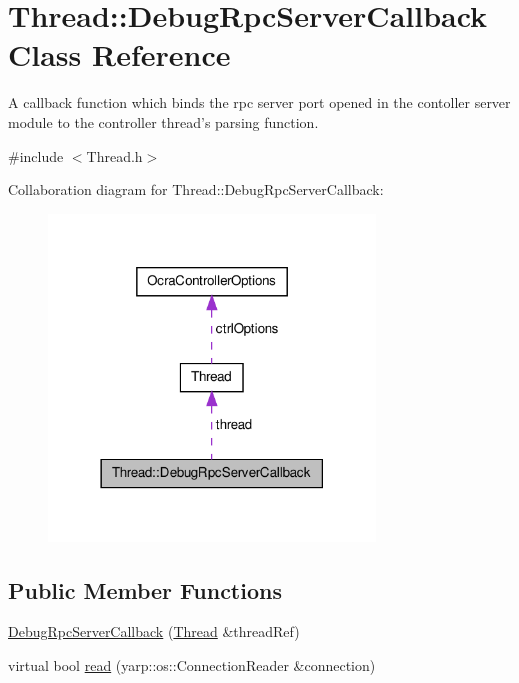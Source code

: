 \hypertarget{classThread_1_1DebugRpcServerCallback}{\section{\-Thread\-:\-:\-Debug\-Rpc\-Server\-Callback \-Class \-Reference}
\label{classThread_1_1DebugRpcServerCallback}
}


\-A callback function which binds the rpc server port opened in the contoller server module to the controller thread's parsing function.  




{\ttfamily \#include $<$\-Thread.\-h$>$}



\-Collaboration diagram for \-Thread\-:\-:\-Debug\-Rpc\-Server\-Callback\-:
\nopagebreak
\begin{figure}[H]
\begin{center}
\leavevmode
\includegraphics[width=246pt]{classThread_1_1DebugRpcServerCallback__coll__graph}
\end{center}
\end{figure}
\subsection*{\-Public \-Member \-Functions}
\begin{DoxyCompactItemize}
\item 
\hyperlink{classThread_1_1DebugRpcServerCallback_a479142cdf2f840df23b4605a532aaddf}{\-Debug\-Rpc\-Server\-Callback} (\hyperlink{classThread}{\-Thread} \&thread\-Ref)
\item 
virtual bool \hyperlink{classThread_1_1DebugRpcServerCallback_a3b39ac9b379ce3212bb2b05a89fa6024}{read} (yarp\-::os\-::\-Connection\-Reader \&connection)
\end{DoxyCompactItemize}
